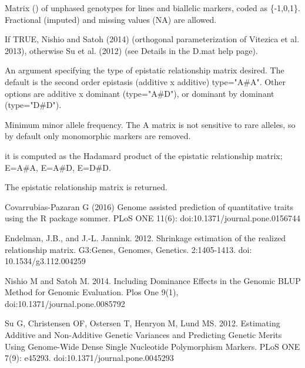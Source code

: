 \documentclass[a4paper]{book}
\begin{document}
\begin{Arguments}
\begin{ldescription}
\item[\code{X}] 
Matrix () of unphased genotypes for  lines and  biallelic markers, 
coded as \{-1,0,1\}. Fractional (imputed) and missing values (NA) are allowed.

\item[\code{nishio}] 
If TRUE, Nishio and Satoh (2014) (orthogonal parameterization of Vitezica et al. 2013), otherwise Su et al. (2012) (see Details in the D.mat help page).

\item[\code{type}] 
An argument specifying the type of epistatic relationship matrix desired. The default is the second order epistasis (additive x additive) type="A\#A". Other options are additive x dominant (type="A\#D"), or dominant by dominant (type="D\#D").  

\item[\code{min.MAF}] 
Minimum minor allele frequency. The A matrix is not sensitive to rare alleles, so by default only monomorphic markers are removed.

\end{ldescription}
\end{Arguments}
%
\begin{Details}\relax
it is computed as the Hadamard product of the epistatic relationship matrix; E=A\#A, E=A\#D, E=D\#D. 
\end{Details}
%
\begin{Value}
The epistatic relationship matrix is returned.

\end{Value}
%
\begin{References}\relax

Covarrubias-Pazaran G (2016) Genome assisted prediction of quantitative traits using the R package sommer. PLoS ONE 11(6): doi:10.1371/journal.pone.0156744 

Endelman, J.B., and J.-L. Jannink. 2012. Shrinkage estimation of the realized relationship matrix. G3:Genes, Genomes, Genetics. 2:1405-1413. doi: 10.1534/g3.112.004259

Nishio M and Satoh M. 2014. Including Dominance Effects in the Genomic BLUP Method for Genomic Evaluation. Plos One 9(1), doi:10.1371/journal.pone.0085792

Su G, Christensen OF, Ostersen T, Henryon M, Lund MS. 2012. Estimating Additive and Non-Additive Genetic Variances and Predicting Genetic Merits Using Genome-Wide Dense Single Nucleotide Polymorphism Markers. PLoS ONE 7(9): e45293. doi:10.1371/journal.pone.0045293

\end{References}
\end{document}
